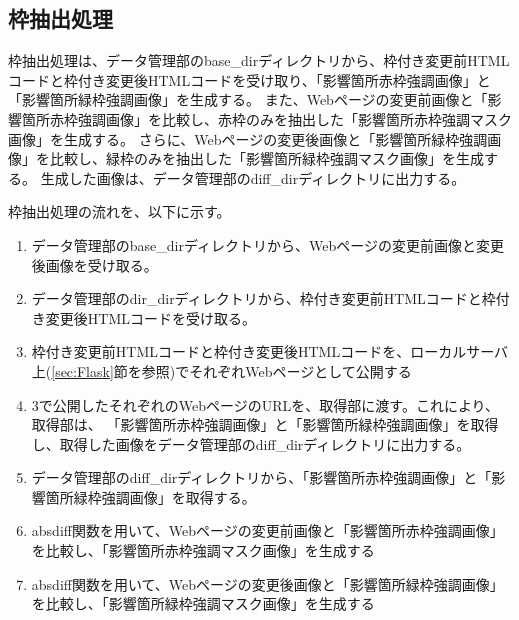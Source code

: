 
\subsection{枠抽出処理}\label{subsec:frame_extraction}
枠抽出処理は、データ管理部のbase\_dirディレクトリから、枠付き変更前HTMLコードと枠付き変更後HTMLコードを受け取り、「影響箇所赤枠強調画像」と「影響箇所緑枠強調画像」を生成する。
また、Webページの変更前画像と「影響箇所赤枠強調画像」を比較し、赤枠のみを抽出した「影響箇所赤枠強調マスク画像」を生成する。
さらに、Webページの変更後画像と「影響箇所緑枠強調画像」を比較し、緑枠のみを抽出した「影響箇所緑枠強調マスク画像」を生成する。
生成した画像は、データ管理部のdiff\_dirディレクトリに出力する。
\par
枠抽出処理の流れを、以下に示す。
\begin{enumerate}
    \item データ管理部のbase\_dirディレクトリから、Webページの変更前画像と変更後画像を受け取る。
    \item データ管理部のdir\_dirディレクトリから、枠付き変更前HTMLコードと枠付き変更後HTMLコードを受け取る。
    \item 枠付き変更前HTMLコードと枠付き変更後HTMLコードを、ローカルサーバ上(\ref{sec:Flask}節を参照)でそれぞれWebページとして公開する
    \item 3で公開したそれぞれのWebページのURLを、取得部に渡す。これにより、取得部は、
          「影響箇所赤枠強調画像」と「影響箇所緑枠強調画像」を取得し、取得した画像をデータ管理部のdiff\_dirディレクトリに出力する。
    \item データ管理部のdiff\_dirディレクトリから、「影響箇所赤枠強調画像」と「影響箇所緑枠強調画像」を取得する。
    \item absdiff関数を用いて、Webページの変更前画像と「影響箇所赤枠強調画像」を比較し、「影響箇所赤枠強調マスク画像」を生成する
    \item absdiff関数を用いて、Webページの変更後画像と「影響箇所緑枠強調画像」を比較し、「影響箇所緑枠強調マスク画像」を生成する
\end{enumerate}

